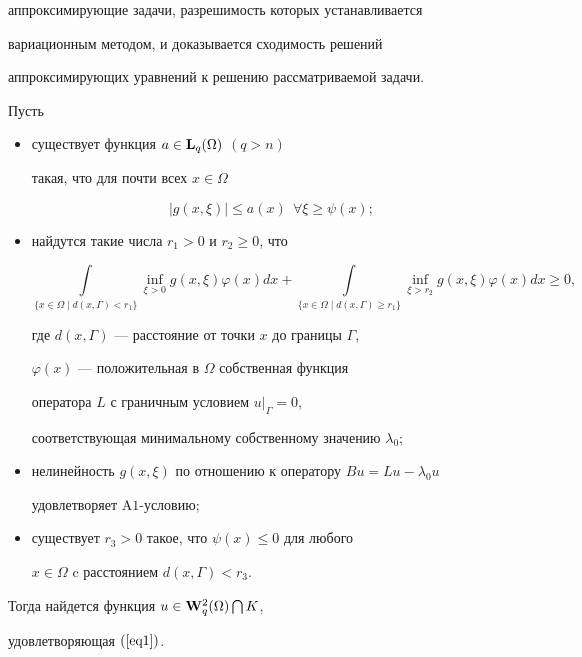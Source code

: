 аппроксимирующие задачи, разрешимость которых устанавливается


вариационным методом, и доказывается сходимость решений


аппроксимирующих уравнений к решению рассматриваемой задачи.








\begin{thmnonum}


Пусть


\begin{itemize}


\item[1.] существует функция $a\in {\bold{L}}_q(\Omega)$ $(q>n)$


такая, что для почти всех $x\in\Omega$


$$


|g(x,\xi)|\le a(x)\ \ \forall \xi\ge\psi(x);


$$


\item[2.] найдутся такие числа $r_1>0$ и $r_2\ge 0$, что


\begin{equation}\label{eq2}


\int\limits_{\{x\in\Omega\mid d(x,\Gamma)<r_1\}}


\inf_{\xi>0}g(x,\xi)\varphi(x)dx


+\int\limits_{\{x\in\Omega\mid d(x,\Gamma)\ge r_1\}}


\inf_{\xi>r_2}g(x,\xi)\varphi(x)dx\ge 0,


\end{equation}


где $d(x,\Gamma)$ --- расстояние от точки $x$ до границы $\Gamma$,


$\varphi(x)$ --- положительная в $\Omega$ собственная функция


оператора $L$ с граничным условием $u |_{\Gamma}=0$,


соответствующая минимальному собственному значению $\lambda_0;$


\item[3.] нелинейность $g(x,\xi)$ по отношению к оператору $Bu=Lu-\lambda_0u$


удовлетворяет $\mathrm A1$-ус\-ло\-вию\/$;$


\item[4.] существует $r_3>0$ такое, что $\psi(x)\le 0$ для любого


$x\in\Omega$ c расстоянием $d(x,\Gamma)< r_3$.


\end{itemize}


Тогда найдется функция $u\in {\bold W}_q^2(\Omega)\bigcap K$,


удовлетворяющая $(\ref{eq1})$.


\end{thmnonum}





